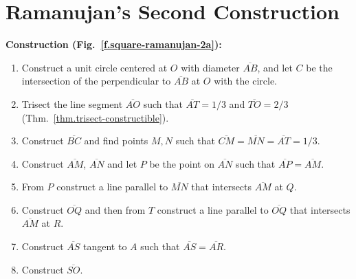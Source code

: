 \newpage

\section{Ramanujan's Second Construction}\label{s.square-ramanujan-second}

\textbf{Construction  (Fig.~\ref{f.square-ramanujan-2a}):}
\begin{enumerate}

\item Construct a unit circle centered at $O$ with diameter $\overline{AB}$, and let $C$ be the intersection of the perpendicular to $\overline{AB}$ at $O$ with the circle.

\item Trisect the line segment $\overline{AO}$ such that $\overline{AT}=1/3$ and $\overline{TO}=2/3$ (Thm.~\ref{thm.trisect-constructible}).

\item Construct $\overline{BC}$ and find points $M,N$ such that $\overline{CM}=\overline{MN}=\overline{AT}=1/3$.

\item Construct $\overline{AM}$, $\overline{AN}$ and let $P$ be the point on $\overline{AN}$ such that $\overline{AP}=\overline{AM}$.

\item From $P$ construct a line parallel to $\overline{MN}$ that intersects $\overline{AM}$ at $Q$.

\item Construct $\overline{OQ}$ and then from $T$ construct a line parallel to $\overline{OQ}$ that intersects $\overline{AM}$ at $R$.

\item Construct $\overline{AS}$ tangent to $A$ such that $\overline{AS}=\overline{AR}$.

\item Construct $\overline{SO}$.
\end{enumerate}

